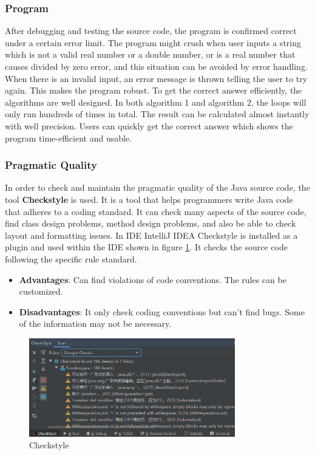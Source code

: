 \documentclass{article}
\begin{document}
\subsubsection{Program}
After debugging and testing the source code, the program is confirmed correct under a certain error limit. The program might crush when user inputs a string which is not a valid real number or a double number, or is a real number that causes divided by zero error, and this situation can be avoided by error handling. When there is an invalid input, an error message is thrown telling the user to try again. This makes the program robust. To get the correct answer efficiently, the algorithms are well designed. In both algorithm 1 and algorithm 2, the loops will only run hundreds of times in total. The result can be calculated almost instantly with well precision. Users can quickly get the correct answer which shows the program time-efficient and usable.\newline

\subsubsection{Pragmatic Quality}
In order to check and maintain the pragmatic quality of the Java source code, the tool \textbf{Checkstyle}\cite{checkstyle} is used. It is a tool that helps programmers write Java code that adheres to a coding standard. It can check many aspects of the source code, find class design problems, method design problems, and also be able to check layout and formatting issues. In IDE IntelliJ IDEA Checkstyle is installed as a plugin\cite{checkstyleplugin} and used within the IDE shown in figure \ref{Fig.checkstyle}. It checks the source code following the specific rule standard.
\begin{itemize}
    \item \textbf{Advantages}: Can find violations of code conventions. The rules can be customized.
    \item \textbf{Disadvantages}: It only check coding conventions but can't find bugs. Some of the information may not be necessary.
\end{itemize}
\begin{figure}[H]
\centering
\includegraphics[width=0.8\textwidth]{checkstyleshot.png}
\caption{Checkstyle}
\label{Fig.checkstyle}
\end{figure}
\end{document}
